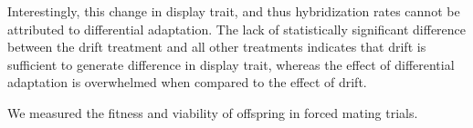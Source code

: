 Interestingly, this change in display trait, and thus hybridization rates cannot be attributed to differential adaptation. 
The lack of statistically significant difference between the drift treatment and all other treatments indicates that drift is sufficient to generate difference in display trait, whereas the effect of differential adaptation is overwhelmed when compared to the effect of drift.

We measured the fitness and viability of offspring in forced mating trials.




